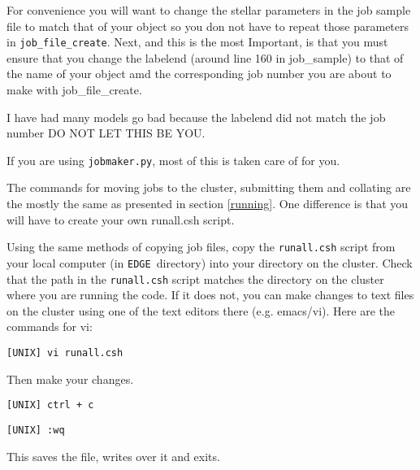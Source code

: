 \documentclass{article}
\newcommand{\edge}{\texttt{EDGE }}
\begin{document}
For convenience you will want to change the stellar parameters in the job sample file to match that of your object so you don not have to repeat those parameters in \texttt{job\_file\_create}. Next, and this is the most Important, is that you must ensure that you change the labelend (around line 160 in job\_sample) to that of the name of your object amd the corresponding job number you are about to make with job\_file\_create. 

I have had many models go bad because the labelend did not match the job number DO NOT LET THIS BE YOU. 

If you are using \texttt{jobmaker.py}, most of this is taken care of for you.

 


The commands for moving jobs to the cluster, submitting them and collating are the mostly the same as presented in section \ref{running}. One difference is that you will have to create your own runall.csh script.

Using the same methods of copying job files, copy the \texttt{runall.csh} script from your local computer (in \edge directory) into your directory on the cluster. Check that the path in the \texttt{runall.csh} script matches the directory on the cluster where you are running the code. If it does not, you can make changes to text files on the cluster using one of the text editors there (e.g. emacs/vi). Here are the commands for vi:

\vspace{2mm}
\texttt{[UNIX] vi runall.csh}
\vspace{2mm}

Then make your changes.

\vspace{2mm}
\texttt{[UNIX] ctrl + c}
\vspace{2mm}

\vspace{2mm}
\texttt{[UNIX] :wq }
\vspace{2mm}

This saves the file, writes over it and exits.
\end{document}
